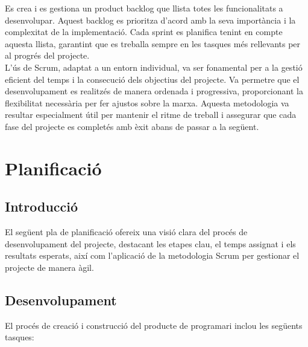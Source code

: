 \documentclass[a4paper,12pt,twoside]{ThesisStyle}
\begin{document}
Es crea i es gestiona un product backlog que llista totes les funcionalitats a desenvolupar. Aquest backlog es prioritza d’acord amb la seva importància i la complexitat de la implementació. Cada sprint es planifica tenint en compte aquesta llista, garantint que es treballa sempre en les tasques més rellevants per al progrés del projecte.\\

L'ús de Scrum, adaptat a un entorn individual, va ser fonamental per a la gestió eficient del temps i la consecució dels objectius del projecte. Va permetre que el desenvolupament es realitzés de manera ordenada i progressiva, proporcionant la flexibilitat necessària per fer ajustos sobre la marxa. Aquesta metodologia va resultar especialment útil per mantenir el ritme de treball i assegurar que cada fase del projecte es completés amb èxit abans de passar a la següent.



\chapter{Planificació}
\label{chp:planificació}

\section{Introducció}
\label{sec:Introducció}

El següent pla de planificació ofereix una visió clara del procés de desenvolupament del projecte, destacant les etapes clau, el temps assignat i els resultats esperats, així com l'aplicació de la metodologia Scrum per gestionar el projecte de manera àgil.



\section{Desenvolupament}

El procés de creació i construcció del producte de programari inclou les següents tasques:
\end{document}
